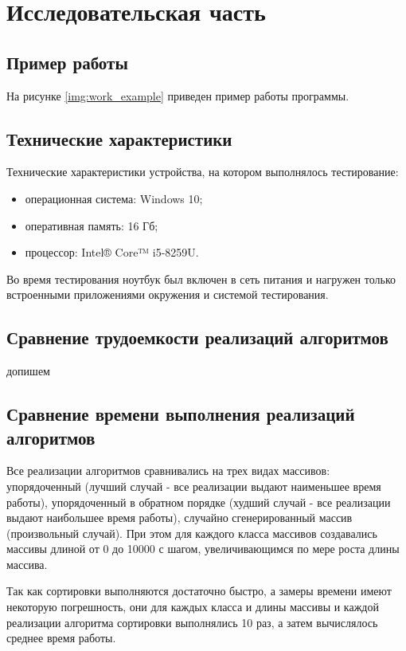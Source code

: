 \chapter{Исследовательская часть}

\section{Пример работы}

На рисунке \ref{img:work_example} приведен пример работы программы.


\section{Технические характеристики}

Технические характеристики устройства, на котором выполнялось тестирование:

\begin{itemize}
	\item операционная система: Windows 10;
	\item оперативная память: 16 Гб;
	\item процессор: Intel® Core™ i5-8259U.
\end{itemize}

Во время тестирования ноутбук был включен в сеть питания и нагружен только встроенными приложениями окружения и системой тестирования.


\section{Сравнение трудоемкости реализаций алгоритмов}
допишем


\section{Сравнение времени выполнения реализаций алгоритмов}

 Все реализации алгоритмов сравнивались на трех видах массивов: упорядоченный (лучший случай - все реализации выдают наименьшее время работы), упорядоченный в обратном порядке (худший случай - все реализации выдают наибольшее время работы), случайно сгенерированный массив (произвольный случай). При этом для каждого класса массивов создавались массивы длиной от 0 до 10000 с шагом, увеличивающимся по мере роста длины массива. 
 
 Так как сортировки выполняются достаточно быстро, а замеры времени имеют некоторую погрешность, они для каждых класса и длины массивы и каждой реализации алгоритма сортировки выполнялись 10 раз, а затем вычислялось среднее время работы.
 
